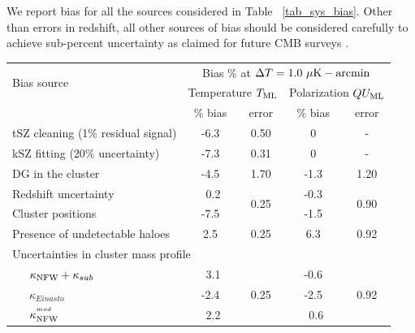    We report bias for all the sources considered in Table ~\ref{tab_sys_bias}. 
 Other than errors in redshift, all other sources of bias should be considered carefully to achieve sub-percent uncertainty as claimed for future CMB surveys \citep{cmbs4-sb1}. 
 \begin {table}[ht]
\centering
\begin{tabular}{| l | c  | c | c | c |}
    \hline
    \multirow{2}{*}{Bias source} & \multicolumn{4}{c|}{Bias \% at $\Delta T = 1.0\ \mu{\rm K-arcmin}$}\\
    \cline{2-5}
    & \multicolumn{2}{c|}{Temperature $T_{\rm ML}$} & \multicolumn{2}{c|}{Polarization $QU_{\rm ML}$} \\%
    \cline{2-5}
     & \% bias& error & \% bias & error \\\hline
    tSZ cleaning (1\% residual signal) & -6.3 & 0.50 & 0 & - \\\hline
    kSZ fitting (20\% uncertainty) & -7.3  & 0.31 & 0 & - \\\hline

    DG in the cluster & -4.5 & 1.70 & -1.3 & 1.20\\\hline
    \hline
    Redshift uncertainty & {\ }0.2 & \multirow{2}{*}{0.25} & -0.3 & \multirow{2}{*}{0.90} \\%
    \cline{1-2}\cline{4-4}
    Cluster positions & -7.5 & & -1.5 & \\\hline
    \hline
   Presence of undetectable haloes & 2.5 & 0.25  &6.3 &0.92\\
    \hline\hline
    \multicolumn{5}{|l|}{Uncertainties in cluster mass profile}\\\hline
   ~~~$\kappa_{\rm NFW} + \kappa_{sub}$ & {\ }3.1 & \multirow{4}{*}{0.25} & -0.6 & \multirow{4}{*}{0.92}\\%
    \cline{1-2}\cline{4-4}
    ~~~$\kappa_{Einasto}$ & -2.4 & & -2.5 &\\%
    \cline{1-2}\cline{4-4}
    ~~~$\kappa_{\rm NFW}^{^{mod}}$ & {\ }2.2  & & {\ }0.6 & \\\hline


\end{tabular}
\end{table}
